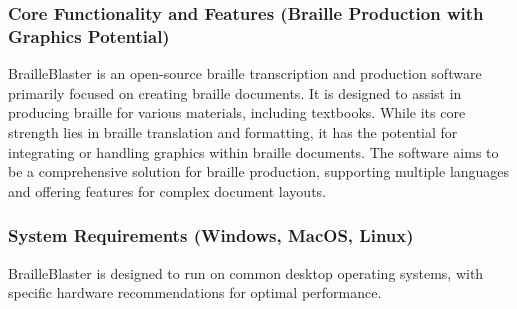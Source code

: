 \subsubsection{Core Functionality and Features (Braille Production with Graphics Potential)}

BrailleBlaster is an open-source braille transcription and production software primarily focused on creating braille documents. It is designed to assist in producing braille for various materials, including textbooks. While its core strength lies in braille translation and formatting, it has the potential for integrating or handling graphics within braille documents. The software aims to be a comprehensive solution for braille production, supporting multiple languages and offering features for complex document layouts.

\subsubsection{System Requirements (Windows, MacOS, Linux)}

BrailleBlaster is designed to run on common desktop operating systems, with specific hardware recommendations for optimal performance.

